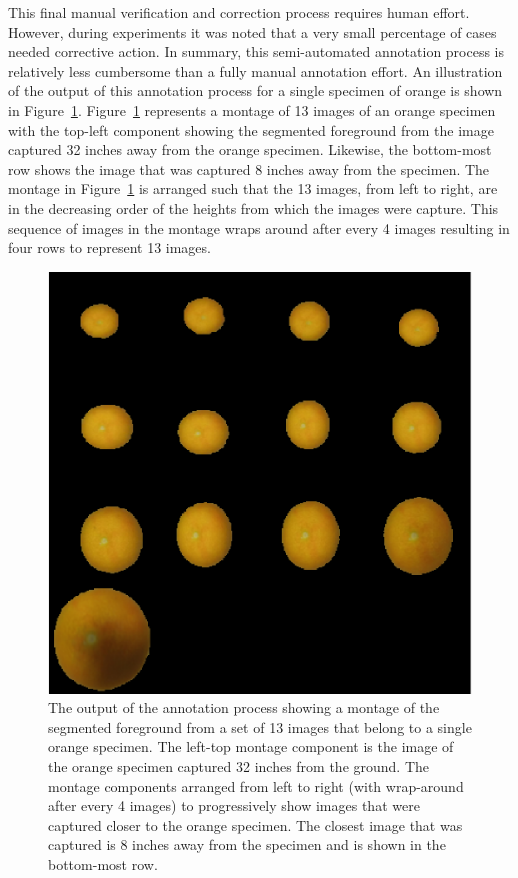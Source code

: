 \documentclass {udthesis}
\begin{document}
This final manual verification and correction process requires human effort. However, during experiments it was noted that a very small percentage of cases needed corrective action. In summary, this semi-automated annotation process is relatively less cumbersome than a fully manual annotation effort. An illustration of the output of this annotation process for a single specimen of orange is shown in Figure~\ref{fig:orange_segment_height_montage}. Figure~\ref{fig:orange_segment_height_montage} represents a montage of 13 images of an orange specimen with the top-left component showing the segmented foreground from the image captured 32 inches away from the orange specimen. Likewise, the bottom-most row shows the image that was captured 8 inches away from the specimen. The montage in Figure~\ref{fig:orange_segment_height_montage} is arranged such that the 13 images, from left to right, are in the decreasing order of the heights from which the images were capture. This sequence of images in the montage wraps 
around after 
every 4 images resulting in four rows to represent 13 images.
%
\begin{figure}
  \centering
  \includegraphics[width=\textwidth]{orange_height_segment_montage}
  \caption[Annotation output for a single specimen]{The output of the annotation process showing a montage of the segmented foreground from a set of 13 images that belong to a single orange specimen. The left-top montage component is the image of the orange specimen captured 32 inches from the ground. The montage components arranged from left to right (with wrap-around after every 4 images) to progressively show images that were captured closer to the orange specimen. The closest image that was captured is 8 inches away from the specimen and is shown in the bottom-most row.} 
  \label{fig:orange_segment_height_montage}
\end{figure}	
%
\end{document}
